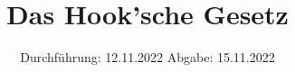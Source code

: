 

\subject{Übung 4}
\title{Das Hook'sche Gesetz}
\date{%
  Durchführung: 12.11.2022
  \hspace{3em}
  Abgabe: 15.11.2022
}



\maketitle
\thispagestyle{empty}
\tableofcontents
\newpage






\printbibliography{}


